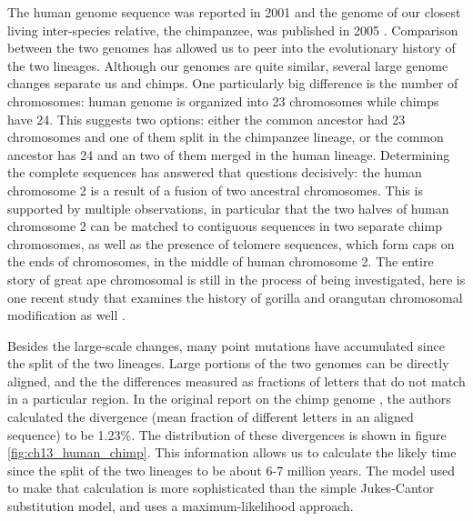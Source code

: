 \documentclass[
  letterpaper,
  DIV=11,
  numbers=noendperiod]{scrreprt}
\begin{document}
The human genome sequence was reported in 2001 and the genome
of our closest living inter-species relative,
the chimpanzee, was published in 2005 \cite{consortium_initial_2005}.
Comparison between the two genomes
has allowed us to peer into the evolutionary history of the two
lineages. Although our genomes are quite similar, several large genome
changes separate us and chimps. One particularly big difference is the
number of chromosomes: human genome is organized into 23 chromosomes
while chimps have 24. This suggests two options: either the common
ancestor had 23 chromosomes and one of them split in the chimpanzee
lineage, or the common ancestor has 24 and an two of them merged in the
human lineage. Determining the complete sequences has answered that
questions decisively: the human chromosome 2 is a result of a fusion of
two ancestral chromosomes. This is supported by multiple observations,
in particular that the two halves of human chromosome 2 can be matched
to contiguous sequences in two separate chimp chromosomes, as well as
the presence of telomere sequences, which form caps on the ends of
chromosomes, in the middle of human chromosome 2. The entire story of
great ape chromosomal is still in the process of being investigated,
here is one recent study that examines the history of gorilla and
orangutan chromosomal modification as well
\cite{ventura_evolution_2012}.

Besides the large-scale changes, many point mutations have accumulated
since the split of the two lineages. Large portions of the two genomes
can be directly aligned, and the the differences measured as fractions
of letters that do not match in a particular region. In the original
report on the chimp genome \cite{consortium_initial_2005}, the authors
calculated the divergence (mean fraction of different letters in an
aligned sequence) to be 1.23\%. The distribution of these divergences is
shown in figure \ref{fig:ch13_human_chimp}. This information allows us
to calculate the likely time since the split of the two lineages to be
about 6-7 million years. The model used to make that calculation is more
sophisticated than the simple Jukes-Cantor substitution model, and uses
a maximum-likelihood approach.
\end{document}
